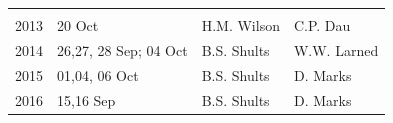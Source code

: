 \documentclass[]{article}
\begin{document}
\begin{longtable}[]{@{}llll@{}}
\begin{minipage}[t]{0.20\columnwidth}
\end{minipage}\tabularnewline
\begin{minipage}[t]{0.12\columnwidth}\raggedright\strut
2013\strut
\end{minipage} & \begin{minipage}[t]{0.38\columnwidth}\raggedright\strut
20 Oct\strut
\end{minipage} & \begin{minipage}[t]{0.18\columnwidth}\raggedright\strut
H.M. Wilson\strut
\end{minipage} & \begin{minipage}[t]{0.20\columnwidth}\raggedright\strut
C.P. Dau\strut
\end{minipage}\tabularnewline
\begin{minipage}[t]{0.12\columnwidth}\raggedright\strut
2014\strut
\end{minipage} & \begin{minipage}[t]{0.38\columnwidth}\raggedright\strut
26,27, 28 Sep; 04 Oct\strut
\end{minipage} & \begin{minipage}[t]{0.18\columnwidth}\raggedright\strut
B.S. Shults\strut
\end{minipage} & \begin{minipage}[t]{0.20\columnwidth}\raggedright\strut
W.W. Larned\strut
\end{minipage}\tabularnewline
\begin{minipage}[t]{0.12\columnwidth}\raggedright\strut
2015\strut
\end{minipage} & \begin{minipage}[t]{0.38\columnwidth}\raggedright\strut
01,04, 06 Oct\strut
\end{minipage} & \begin{minipage}[t]{0.18\columnwidth}\raggedright\strut
B.S. Shults\strut
\end{minipage} & \begin{minipage}[t]{0.20\columnwidth}\raggedright\strut
D. Marks\strut
\end{minipage}\tabularnewline
\begin{minipage}[t]{0.12\columnwidth}\raggedright\strut
2016\strut
\end{minipage} & \begin{minipage}[t]{0.38\columnwidth}\raggedright\strut
15,16 Sep\strut
\end{minipage} & \begin{minipage}[t]{0.18\columnwidth}\raggedright\strut
B.S. Shults\strut
\end{minipage} & \begin{minipage}[t]{0.20\columnwidth}\raggedright\strut
D. Marks\strut
\end{minipage}\tabularnewline
\bottomrule
\end{longtable}
\end{document}
